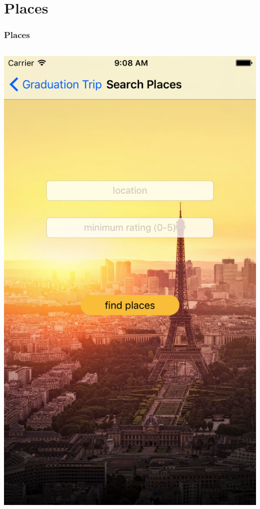 \documentclass{beamer}
\begin{document}
\section{Places}
\begin{frame}
\frametitle{Places}
\begin{columns}
    \begin{column}{0.3\textwidth}
        \begin{center}
            \includegraphics[scale=0.14]{placesSearch}
        \end{center}

\end{column}
\end{columns}
\end{frame}
\end{document}
